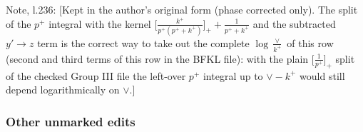 \documentclass[10pt]{article}
\newenvironment{notebox}{\def\FrameCommand{{\color{notebar}\vrule width 1.5pt}\hspace{6pt}}\MakeFramed{\advance\hsize-\width\FrameRestore}\small}{\endMakeFramed}
\begin{document}
\begin{notebox}\textsf{\small Note, l.236:} [Kept in the author's original form (phase corrected only). The split of the $p^{+}$ integral with the kernel $\big[\frac{k^{+}}{p^{+}(p^{+}+k^{+})}\big]_{+}+\frac{1}{p^{+}+k^{+}}$ and the subtracted $y'\to z$ term is the correct way to take out the complete $\log\frac{\vee}{k^{+}}$ of this row (second and third terms of this row in the BFKL file): with the plain $\big[\frac{1}{p^{+}}\big]_{+}$ split of the checked Group III file the left-over $p^{+}$ integral up to $\vee-k^{+}$ would still depend logarithmically on $\vee$.]\end{notebox}
\subsubsection*{Other unmarked edits}
\end{document}
